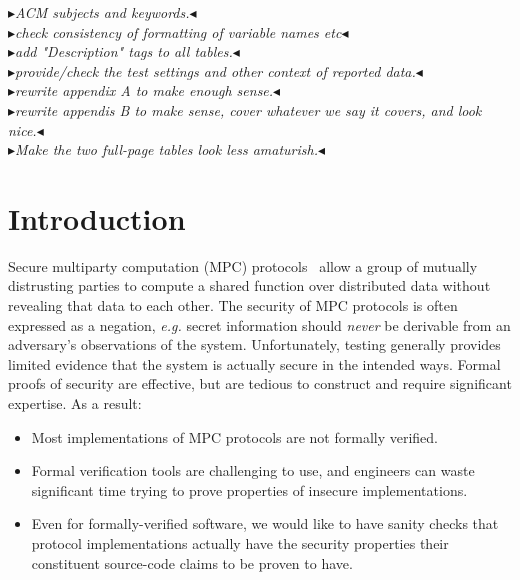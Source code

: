 \documentclass[acmlarge, manuscript, screen, review, anonymous, table]{acmart}
\newcommand{\eg}{\textit{e.g.}\xspace}
\newcommand{\mynote}[2]
    {{\color{red} \fbox{\bfseries\sffamily\scriptsize#1}
    {\small$\blacktriangleright$\textsf{\emph{#2}}$\blacktriangleleft$}}~}
\newcommand{\todo}[1]{\mynote{TODO}{#1}}
\begin{document}



\maketitle

\todo{ACM subjects and keywords.}\\
\todo{check consistency of formatting of variable names etc}\\
\todo{add "Description" tags to all tables.}\\
\todo{provide/check the test settings and other context of reported data.}\\
\todo{rewrite appendix A to make enough sense.}\\
\todo{rewrite appendis B to make sense, cover whatever we say it covers, and look nice.}\\
\todo{Make the two full-page tables look less amaturish.}\\



\section{Introduction}

Secure multiparty computation (MPC) protocols~\cite{evans2018pragmatic} allow a group of mutually distrusting parties to compute a shared function over distributed data without revealing that data to each other.
The security of MPC protocols is often expressed as a negation,
\eg secret information should \emph{never} be derivable from an adversary's observations of the system.
Unfortunately, testing generally provides limited evidence that the system is actually secure in the intended ways.
Formal proofs of security are effective, but are tedious to construct and require significant expertise.
As a result:
%
\begin{itemize}
\item Most implementations of MPC protocols are not formally verified.
\item Formal verification tools are challenging to use, and engineers can waste significant time trying to prove properties of insecure implementations.
\item Even for formally-verified software, we would like to have sanity checks
  that protocol implementations actually have the security properties their constituent source-code claims to be proven to have.
\end{itemize}
\end{document}
